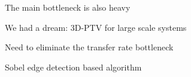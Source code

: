 \documentclass[aspectratio=43]{beamer}
\begin{document}
\begin{frame}{The main bottleneck is also heavy}
\begin{multicols}{2}
\centering
{}
\end{multicols}
\end{frame}


\begin{frame}{We had a dream: 3D-PTV for large scale systems}
\centering{}
\end{frame}



\begin{frame}{Need to eliminate the transfer rate bottleneck}
\begin{card}
\begin{multicols}{2}
\centering
{}
\end{multicols}
\end{card}
\end{frame}

\begin{frame}{Sobel edge detection based algorithm}
\centering
{}
\end{frame}
\end{document}
